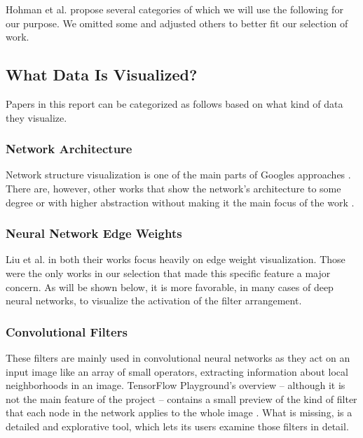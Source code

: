 \documentclass{acmsiggraph}               %
\begin{document}
Hohman et al. propose several categories of which we will use the following for our purpose. We omitted some and adjusted others to better fit our selection of work.

\subsection{What Data Is Visualized?}
Papers in this report can be categorized as follows based on what kind of data they visualize.
\subsubsection{Network Architecture}
Network structure visualization is one of the main parts of Googles approaches \cite{Wongsuphasawat2018,Smilkov2017}.
There are, however, other works that show the network's architecture to some degree or with higher abstraction without making it the main focus of the work \cite{Liu2016,Liu2018}.
\subsubsection{Neural Network Edge Weights}
Liu et al. in both their works \cite{Liu2016,Liu2018} focus heavily on edge weight visualization. Those were the only works in our selection that made this specific feature a major concern. As will be shown below, it is more favorable, in many cases of deep neural networks, to visualize the activation of the filter arrangement.
\subsubsection{Convolutional Filters}
These filters are mainly used in convolutional neural networks as they act on an input image like an array of small operators, extracting information about local neighborhoods in an image. TensorFlow Playground's overview -- although it is not the main feature of the project -- contains a small preview of the kind of filter that each node in the network applies to the whole image \cite{Smilkov2017}. What is missing, is a detailed and explorative tool, which lets its users examine those filters in detail.
\end{document}
